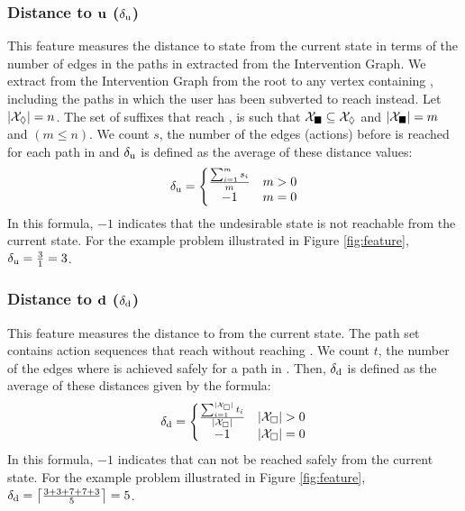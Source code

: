 \subsubsection{Distance to $\boldsymbol{\mathrm{u}}$ ($\delta_\mathrm{u}$)} 
This feature measures the distance to state \undesired from the current state in terms of the number of edges in the paths in \Suffixes extracted from the Intervention Graph. 
We extract \Suffixes from the Intervention Graph from the root to any vertex containing \desired, including the paths in which the user has been subverted to reach \undesired instead. 
Let $\left | \mathcal{X}_\Diamond \right |=n$. 
The set of suffixes that reach \undesired, \SuffixesUnsafe is such that $\mathcal{X}_{\blacksquare} \subseteq \mathcal{X}_\Diamond$ and $\left | \mathcal{X}_{\blacksquare} \right |=m$ and $(m\leq n)$.
We count  $s$, the number of the edges (actions) before \undesired is reached for each path in \SuffixesUnsafe and $\delta_\mathrm{u}$ is defined as the average of these distance values:
\begin{equation*} 
\delta_\mathrm{u} = \left\{\begin{matrix}
\frac{\sum_{i=1}^{m}s_i}{m} & m>0\\ 
-1 &  m=0
\end{matrix}\right.
\end{equation*} 
In this formula, $-1$ indicates that the undesirable state is not reachable from the current state. For the example problem illustrated in Figure \ref{fig:feature}, $\delta_\mathrm{u}=\frac{3}{1}=3$.

\subsubsection{Distance to $\boldsymbol{\mathrm{d}}$ ($\delta_\mathrm{d}$)} 
This feature measures the distance to \desired from the current state. The path set \SuffixesSafe contains action sequences that reach \desired without reaching \undesired.
We count  $t$, the number of the edges where \desired is achieved safely for a path in \SuffixesSafe. 
Then, $\delta_\mathrm{d}$ is defined as the average of these distances given by the formula:
\begin{equation*} 
\delta_\desired = \left\{\begin{matrix}
\frac{\sum_{i=1}^{|\SuffixesSafe|}t_i}{|\SuffixesSafe|} & |\SuffixesSafe|>0\\ 
-1 &  |\SuffixesSafe|=0
\end{matrix}\right.
\end{equation*}
In this formula, $-1$ indicates that \desired can not be reached safely from the current state. For the example problem illustrated in Figure \ref{fig:feature}, $\delta_\mathrm{d}=\left \lceil \frac{3+3+7+7+3}{5} \right \rceil=5$.


